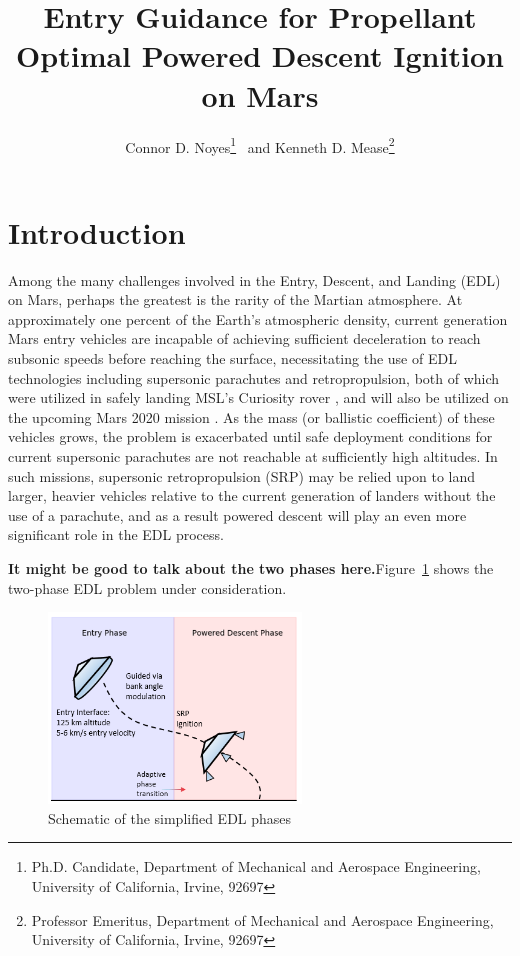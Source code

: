 \documentclass[letterpaper, preprint, paper,11pt]{AAS}
\title{Entry Guidance for Propellant Optimal Powered Descent Ignition on Mars}
\begin{document}
\author{Connor D. Noyes\thanks{Ph.D. Candidate, Department of Mechanical and Aerospace Engineering, University of California, Irvine, 92697} \ and Kenneth D. Mease\thanks{Professor Emeritus, Department of Mechanical and Aerospace Engineering, University of California, Irvine, 92697}}
\maketitle




\section{Introduction}
Among the many challenges involved in the Entry, Descent, and Landing (EDL) on Mars, perhaps the greatest is the rarity of the Martian atmosphere. At approximately one percent of the Earth's atmospheric density, current generation Mars entry vehicles are incapable of achieving sufficient deceleration to reach subsonic speeds before reaching the surface, necessitating the use of EDL technologies including supersonic parachutes and retropropulsion, both of which were utilized in safely landing MSL's Curiosity rover \cite{MSL_EDL}, and will also be utilized on the upcoming Mars 2020 mission \cite{M2020_EDL}. As the mass (or ballistic coefficient) of these vehicles grows, the problem is exacerbated until safe deployment conditions for current supersonic parachutes are not reachable at sufficiently high altitudes. In such missions, supersonic retropropulsion (SRP) may be relied upon to land larger, heavier vehicles relative to the current generation of landers without the use of a parachute, and as a result powered descent will play an even more significant role in the EDL process.  

\textbf{It might be good to talk about the two phases here.}Figure~\ref{fig_phases} shows the two-phase EDL problem under consideration. 
\begin{figure}[h!]
	\centering
	\includegraphics[width=0.6\textwidth]{EDLPhaseDiagram} 
	\caption{Schematic of the simplified EDL phases}
	\label{fig_phases}
\end{figure}
\end{document}
